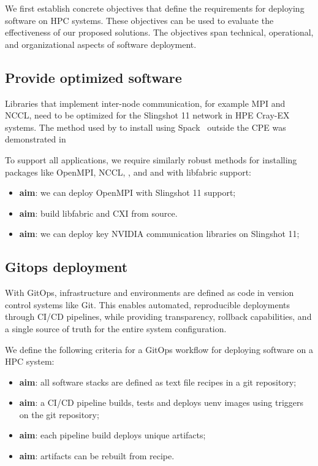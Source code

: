 We first establish concrete objectives that define the requirements for deploying software on HPC systems. These objectives can be used to evaluate the effectiveness of our proposed solutions. The objectives span technical, operational, and organizational aspects of software deployment.

\subsection{Provide optimized software}

Libraries that implement inter-node communication, for example MPI and NCCL, need to be optimized for the Slingshot 11 network in HPE Cray-EX systems.
The method used by \stackinator to install \craympich using Spack~\cite{gamblin:sc15} outside the CPE was demonstrated in~\cite{uenv2023} 

To support all applications, we require similarly robust methods for installing packages like OpenMPI, NCCL, \nvshmem, \cufftmp and \cusolvermp and with libfabric support:
\begin{itemize}
    \item \textbf{aim}: we can deploy OpenMPI with Slingshot 11 support;
    \item \textbf{aim}: build libfabric and CXI from source.
    \item \textbf{aim}: we can deploy key NVIDIA communication libraries on Slingshot 11;
\end{itemize}

\subsection{Gitops deployment}

With GitOps, infrastructure and environments are defined as code in version control systems like Git.
This enables automated, reproducible deployments through CI/CD pipelines, while providing transparency, rollback capabilities, and a single source of truth for the entire system configuration.

We define the following criteria for a GitOps workflow for deploying software on a HPC system:
\begin{itemize}
    \item \textbf{aim}: all software stacks are defined as text file recipes in a git repository;
    \item \textbf{aim}: a CI/CD pipeline builds, tests and deploys uenv images using triggers on the git repository;
    \item \textbf{aim}: each pipeline build deploys unique artifacts;
    \item \textbf{aim}: artifacts can be rebuilt from recipe.
\end{itemize}

